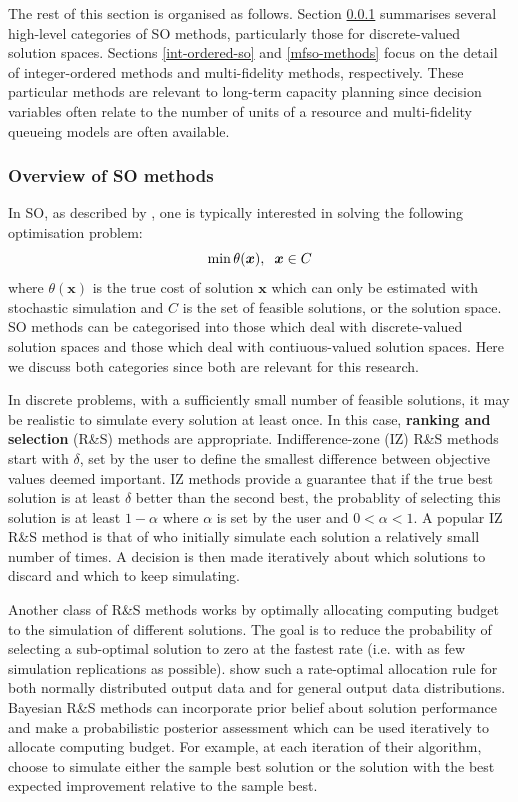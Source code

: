 \documentclass[12pt,a4paper]{article}
\begin{document}
The rest of this section is organised as follows. Section \ref{lit-review-so} summarises several high-level categories of SO methods, particularly those for discrete-valued solution spaces. Sections \ref{int-ordered-so} and \ref{mfso-methods} focus on the detail of integer-ordered methods and multi-fidelity methods, respectively. These particular methods are relevant to long-term capacity planning since decision variables often relate to the number of units of a resource and multi-fidelity queueing models are often available. 

\subsubsection{Overview of SO methods}\label{lit-review-so}

In SO, as described by \cite{nelson2021foundations}, one is typically interested in solving the following optimisation problem: 
%
\begin{equation}\label{SO_general}
    \min \theta(\boldsymbol{x}), \hspace{0.2cm} \boldsymbol{x} \in C
\end{equation}
%
where $\theta(\boldsymbol{x})$ is the true cost of solution $\boldsymbol{x}$ which can only be estimated with stochastic simulation and $C$ is the set of feasible solutions, or the solution space. SO methods can be categorised into those which deal with discrete-valued solution spaces and those which deal with contiuous-valued solution spaces. Here we discuss both categories since both are relevant for this research. 

In discrete problems, with a sufficiently small number of feasible solutions, it may be realistic to simulate every solution at least once. In this case, \textbf{ranking and selection} (R\&S) methods are appropriate. Indifference-zone (IZ) R\&S methods start with $\delta$, set by the user to define the smallest difference between objective values deemed important. IZ methods provide a guarantee that if the true best solution is at least $\delta$ better than the second best, the probablity of selecting this solution is at least $1-\alpha$ where $\alpha$ is set by the user and $0<\alpha<1$. A popular IZ R\&S method is that of \cite{kim2001fully} who initially simulate each solution a relatively small number of times. A decision is then made iteratively about which solutions to discard and which to keep simulating.

Another class of R\&S methods works by optimally allocating computing budget to the simulation of different solutions. The goal is to reduce the probability of selecting a sub-optimal solution to zero at the fastest rate (i.e. with as few simulation replications as possible). \cite{glynn2004large} show such a rate-optimal allocation rule for both normally distributed output data and for general output data distributions. Bayesian R\&S methods can incorporate prior belief about solution performance and make a probabilistic posterior assessment which can be used iteratively to allocate computing budget. For example, at each iteration of their algorithm, \cite{chen2019complete} choose to simulate either the sample best solution or the solution with the best expected improvement relative to the sample best. 
\end{document}
